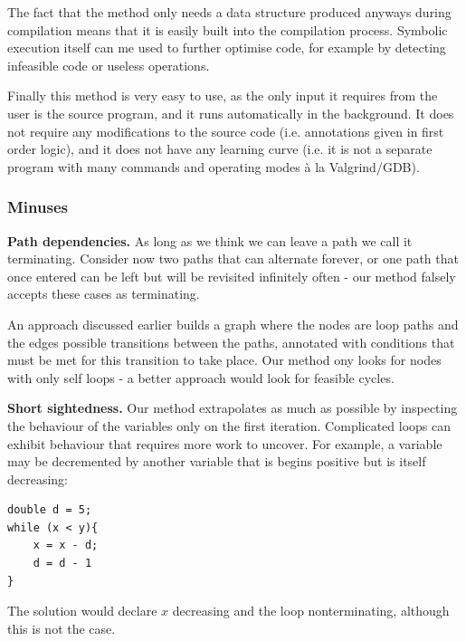 \documentclass[12pt,a4paper]{article}
\begin{document}
The fact that the method only needs a data structure produced anyways during compilation means that it is easily built into the compilation process. Symbolic execution
itself can me used to further optimise code, for example by detecting infeasible code or useless operations.

Finally this method is very easy to use, as the only input it requires from the user is the source program, and it runs automatically in the background. It does
not require any modifications to the source code (i.e. annotations given in first order logic), and it does not have any learning curve (i.e. it is not a separate
program with many commands and operating modes \`a la Valgrind/GDB). 

\subsubsection{Minuses}
\textbf{Path dependencies.} As long as we think we can leave a path we call it terminating. Consider now two paths that can alternate forever, or
one path that once entered can be left but will be revisited infinitely often - our method falsely accepts these cases as terminating.

An approach discussed earlier \citep{loopster} builds a graph where the nodes are loop paths and the edges possible transitions between the paths, annotated with
conditions that must be met for this transition to take place. Our method ony looks for nodes with only self loops - a better approach would look for feasible cycles.

\textbf{Short sightedness.} Our method extrapolates as much as possible by inspecting the behaviour of the variables only on the first iteration. Complicated loops can exhibit behaviour that requires more work to uncover. For example, a variable may be decremented by another variable that is begins positive but is itself
decreasing:

\begin{center}
\begin{minipage}{5.5cm}
\begin{lstlisting}[language=myLang, frame=tlrb, numbers=none, label={lst:termin}, linewidth=5cm]
double d = 5;
while (x < y){
	x = x - d;
	d = d - 1
}
\end{lstlisting}
\end{minipage}
\end{center}

The solution would declare $x$ decreasing and the loop nonterminating, although this is not the case.\\
\end{document}
